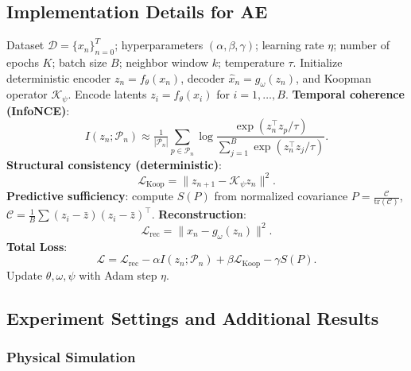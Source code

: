 \documentclass{article} %
\begin{document}
\clearpage
\subsection{Implementation Details for AE} \label{pesudocode:ae}
\begin{algorithm}[h]
\caption{Information-Theoretic Koopman Representation (AE, deterministic)}
\begin{algorithmic}[1]
\REQUIRE Dataset $\mathcal{D}=\{x_n\}_{n=0}^T$; hyperparameters $(\alpha, \beta, \gamma)$; learning rate $\eta$; number of epochs $K$; batch size $B$; neighbor window $k$; temperature $\tau$.
\STATE Initialize deterministic encoder $z_n = f_\theta(x_n)$, decoder $\hat x_n = g_\omega(z_n)$, and Koopman operator $\mathcal K_{\psi}$.
        \STATE Encode latents $z_i = f_\theta(x_i)$ for $i=1,\dots,B$.
        \STATE \textbf{Temporal coherence (InfoNCE)}: 
        \[
        I(z_n;\mathcal P_n)\approx \tfrac{1}{|\mathcal P_n|}\sum_{p\in\mathcal P_n}
        \log \frac{\exp(z_n^\top z_p/\tau)}{\sum_{j=1}^B \exp(z_n^\top z_j/\tau)} .
        \]
        \STATE \textbf{Structural consistency (deterministic)}:
        \[
        \mathcal L_\text{Koop} = \|z_{n+1} - \mathcal{K}_{\psi} z_n\|^2 .
        \]
        \STATE \textbf{Predictive sufficiency}: compute $S(P)$ from normalized covariance $P=\tfrac{\mathcal C}{\mathrm{tr}(\mathcal C)}$, $\mathcal C=\tfrac{1}{B}\sum (z_i-\bar z)(z_i-\bar z)^\top$.
        \STATE \textbf{Reconstruction}: 
        \[
        \mathcal L_\text{rec} = \|x_n - g_\omega(z_n)\|^2 .
        \]
        \STATE \textbf{Total Loss}:
        \[
        \mathcal L = \mathcal L_\text{rec} - \alpha I(z_n;\mathcal P_n) + \beta \mathcal L_\text{Koop} - \gamma S(P) .
        \]
        \STATE Update $\theta,\omega,\psi$ with Adam step $\eta$.
    \ENDFOR
\ENDFOR
\end{algorithmic}
\end{algorithm}

\clearpage
\subsection{Experiment Settings and Additional Results} \label{append:experiment_setting}

\subsubsection{Physical Simulation}
\end{document}
